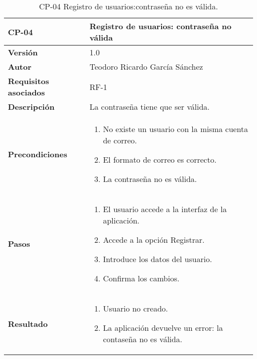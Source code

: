 \begin{table}[p]
	\centering
	\begin{tabularx}{\linewidth}{ p{} p{} }
		\toprule
		\textbf{CP-04}    & \textbf{Registro de usuarios: contraseña no válida}\\
		\toprule
		\textbf{Versión}              & 1.0    \\
		\textbf{Autor}                & Teodoro Ricardo García Sánchez \\
		\textbf{Requisitos asociados} & RF-1 \\
		\textbf{Descripción}          & La contraseña tiene que ser válida.\\
		\textbf{Precondiciones}       &  
		\begin{enumerate}
			\def\labelenumi{\arabic{enumi}.}
			\tightlist
			\item No existe un usuario con la misma cuenta de correo.
			\item El formato de correo es correcto.
			\item La contraseña no es válida.
		\end{enumerate}\\
		\textbf{Pasos}             &
		\begin{enumerate}
			\def\labelenumi{\arabic{enumi}.}
			\tightlist
			\item El usuario accede a la interfaz de la aplicación.
			\item Accede a la opción Registrar.
			\item Introduce los datos del usuario.
			\item Confirma los cambios.
		\end{enumerate}\\
		\textbf{Resultado}          & 
		\begin{enumerate}
			\item Usuario no creado.
			\item La aplicación devuelve un error: la contaseña no es válida.
		\end{enumerate}\\
		\bottomrule
	\end{tabularx}
	\caption{CP-04 Registro de usuarios:contraseña no es válida.}
\end{table}

